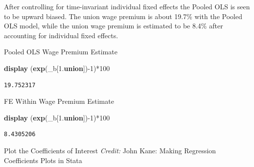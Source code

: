 \documentclass[
]{book}
\newenvironment{Shaded}{\begin{snugshade}}{\end{snugshade}}
\newcommand{\FunctionTok}[1]{\textcolor[rgb]{0.13,0.29,0.53}{\textbf{#1}}}
\newcommand{\KeywordTok}[1]{\textcolor[rgb]{0.13,0.29,0.53}{\textbf{#1}}}
\newcommand{\NormalTok}[1]{#1}
\begin{document}
After controlling for time-invariant individual fixed effects the Pooled OLS is seen to be upward biased. The union wage premium is about 19.7\% with the Pooled OLS model, while the union wage premium is estimated to be 8.4\% after accounting for individual fixed effects.

Pooled OLS Wage Premium Estimate

\begin{Shaded}
\begin{Highlighting}[]
\KeywordTok{display}\NormalTok{ (}\FunctionTok{exp}\NormalTok{(\_b[1.}\KeywordTok{union}\NormalTok{]){-}1)*100}
\end{Highlighting}
\end{Shaded}

\begin{verbatim}
19.752317
\end{verbatim}

FE Within Wage Premium Estimate

\begin{Shaded}
\begin{Highlighting}[]
\KeywordTok{display}\NormalTok{ (}\FunctionTok{exp}\NormalTok{(\_b[1.}\KeywordTok{union}\NormalTok{]){-}1)*100}
\end{Highlighting}
\end{Shaded}

\begin{verbatim}
8.4305206
\end{verbatim}

Plot the Coefficients of Interest
\emph{Credit:} John Kane: Making Regression Coefficients Plots in Stata
\end{document}
